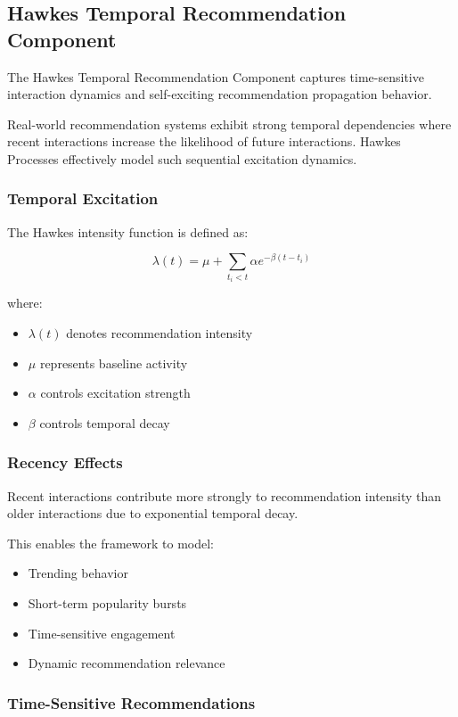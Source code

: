 \documentclass{article}
\begin{document}
\subsection{Hawkes Temporal Recommendation Component}

The Hawkes Temporal Recommendation Component captures time-sensitive interaction dynamics and self-exciting recommendation propagation behavior.

Real-world recommendation systems exhibit strong temporal dependencies where recent interactions increase the likelihood of future interactions. Hawkes Processes effectively model such sequential excitation dynamics.

\subsubsection{Temporal Excitation}

The Hawkes intensity function is defined as:

\[
\lambda(t)=\mu+\sum_{t_i<t}\alpha e^{-\beta(t-t_i)}
\]

where:
\begin{itemize}
\item \(\lambda(t)\) denotes recommendation intensity
\item \(\mu\) represents baseline activity
\item \(\alpha\) controls excitation strength
\item \(\beta\) controls temporal decay
\end{itemize}


\subsubsection{Recency Effects}

Recent interactions contribute more strongly to recommendation intensity than older interactions due to exponential temporal decay.

This enables the framework to model:
\begin{itemize}
\item Trending behavior
\item Short-term popularity bursts
\item Time-sensitive engagement
\item Dynamic recommendation relevance
\end{itemize}

\subsubsection{Time-Sensitive Recommendations}
\end{document}
